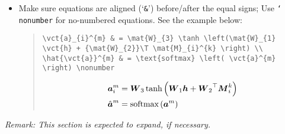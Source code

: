 \begin{itemize}
  \item
    Make sure equations are aligned (`\texttt{\&}') before/after the equal signs;
    Use \texttt{\char`\\nonumber} for no-numbered equations.
    See the example below:
  \begin{quote}\begin{scriptsize}
    \begin{verbatim}
\vct{a}_{i}^{m} & = \mat{W}_{3} \tanh \left(\mat{W}_{1}
\vct{h} + {\mat{W}_{2}}\T \mat{M}_{i}^{k} \right) \\
\hat{\vct{a}}^{m} & = \text{softmax} \left( \vct{a}^{m}
\right) \nonumber
    \end{verbatim}

    \begin{align}
      \boldsymbol{a}_{i}^{m} & = \boldsymbol{W}_{3} \tanh \left(\boldsymbol{W}_{1} \boldsymbol{h} + {\boldsymbol{W}_{2}}^{\top} \boldsymbol{M}_{i}^{k} \right) \\
      \hat{\boldsymbol{a}}^{m} & = \text{softmax} \left(\boldsymbol{a}^{m}\right) \nonumber
    \end{align}
  \end{scriptsize}\end{quote}

\end{itemize}

\textit{Remark: This section is expected to expand, if necessary.} 